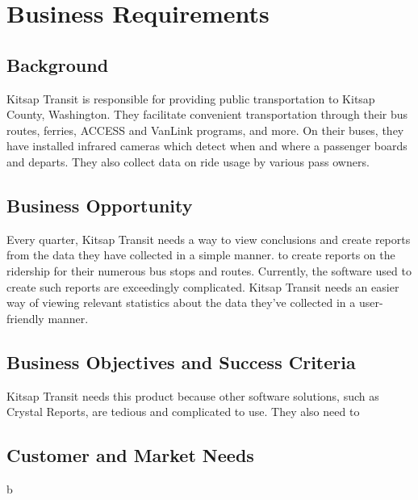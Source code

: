 \section{Business Requirements}
\subsection{Background}
Kitsap Transit is responsible for providing public transportation to Kitsap County, Washington. They facilitate convenient transportation through their bus routes, ferries, ACCESS and VanLink programs, and more. On their buses, they have installed infrared cameras which detect when and where a passenger boards and departs. They also collect data on ride usage by various pass owners.
\raggedbottom
\subsection{Business Opportunity}
Every quarter, Kitsap Transit needs a way to view conclusions and create reports from the data they have collected in a simple manner. to create reports on the ridership for their numerous bus stops and routes. Currently, the software used to create such reports are exceedingly complicated. Kitsap Transit needs an easier way of viewing relevant statistics about the data they've collected in a user-friendly manner.
\raggedbottom
\subsection{Business Objectives and Success Criteria}
Kitsap Transit needs this product because other software solutions, such as Crystal Reports, are tedious and complicated to use. They also need to 
\raggedbottom
\subsection{Customer and Market Needs}
b
\raggedbottom
